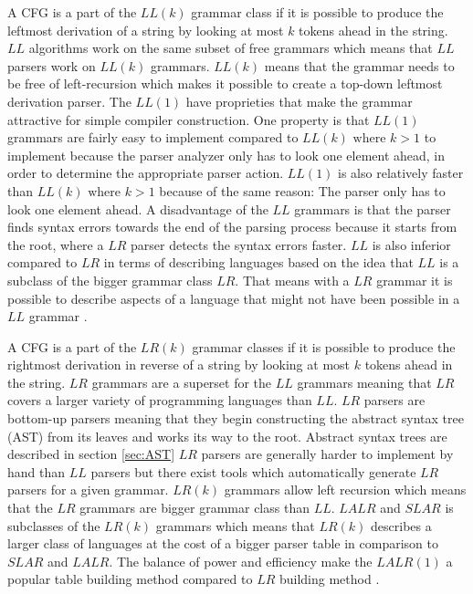A CFG is a part of the $LL(k)$ grammar class if it is possible to produce the leftmost derivation of a string by looking at most $k$ tokens ahead in the string. $LL$ algorithms work on the same subset of free grammars which means that $LL$ parsers work on $LL(k)$ grammars. $LL(k)$ means that the grammar needs to be free of left-recursion which makes it possible to create a top-down leftmost derivation parser.
The $LL(1)$ have proprieties that make the grammar attractive for simple compiler construction. One property is that $LL(1)$ grammars are fairly easy to implement compared to $LL(k)\text{ where }k > 1$ to implement because the parser analyzer only has to look one element ahead, in order to determine the appropriate parser action. $LL(1)$ is also relatively faster than $LL(k)\text{ where }k > 1$ because of the same reason: The parser only has to look one element ahead. A disadvantage of the $LL$ grammars is that the parser finds syntax errors towards the end of the parsing process because it starts from the root, where a $LR$ parser detects the syntax errors faster. $LL$ is also inferior compared to $LR$ in terms of describing languages based on the idea that $LL$ is a subclass of the bigger grammar class $LR$. That means with a $LR$ grammar it is possible to describe aspects of a language that might not have been possible in a $LL$ grammar \citep{CraftingACompiler} \citep{sebesta}.

A CFG is a part of the $LR(k)$ grammar classes if it is possible to produce the rightmost derivation in reverse of a string by looking at most $k$ tokens ahead in the string. $LR$ grammars are a superset for the $LL$ grammars meaning that $LR$ covers a larger variety of programming languages than $LL$. $LR$ parsers are bottom-up parsers meaning that they begin constructing the abstract syntax tree (AST) from its leaves and works its way to the root. Abstract syntax trees are described in section \ref{sec:AST} $LR$ parsers are generally harder to implement by hand than $LL$ parsers but there exist tools which automatically generate $LR$ parsers for a given grammar. $LR(k)$ grammars allow left recursion which means that the $LR$ grammars are bigger grammar class than $LL$. $LALR$ and $SLAR$ is subclasses of the $LR(k)$ grammars which means that $LR(k)$ describes a larger class of languages at the cost of a bigger parser table in comparison to $SLAR$ and $LALR$. The balance of power and efficiency make the $LALR(1)$ a popular table building method compared to $LR$ building method \citep{CraftingACompiler} \citep{sebesta}.